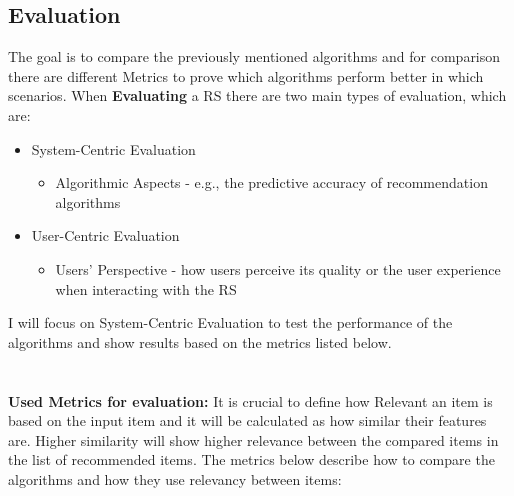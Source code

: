 \documentclass[\myFontSize,oneside,english,hidelinks,a4paper]{article}
\begin{document}
\subsection{Evaluation}
The goal is to compare the previously mentioned algorithms and for comparison there are different Metrics to prove which algorithms perform better in which scenarios. When \textbf{Evaluating} a RS there are two main types of evaluation, which are:
\begin{itemize}
\item System-Centric Evaluation
	\begin{itemize}
	\item Algorithmic Aspects - e.g., the predictive accuracy of recommendation algorithms
	\end{itemize}

\item User-Centric Evaluation
	\begin{itemize}
	\item Users' Perspective - how users perceive its quality or the user experience when interacting with the RS
	\end{itemize}
\end{itemize}
%
%
I will focus on System-Centric Evaluation to test the performance of the algorithms and show results based on the metrics listed below.\\\\\\
%
%
\textbf{Used Metrics for evaluation:}
It is crucial to define how Relevant an item is based on the input item and it will be calculated as how similar their features are. Higher similarity will show higher relevance between the compared items in the list of recommended items. The metrics below describe how to compare the algorithms and how they use relevancy between items:
\end{document}
